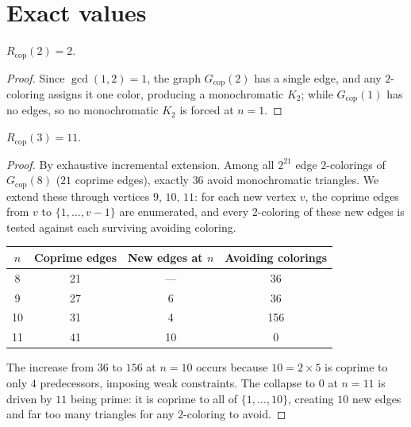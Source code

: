 \documentclass[12pt]{article}
\newcommand{\Rcop}{R_{\mathrm{cop}}}
\newcommand{\Gcop}{G_{\mathrm{cop}}}
\begin{document}
\section{Exact values}\label{sec:exact}

\begin{theorem}\label{thm:rcop2}
$\Rcop(2)=2$.
\end{theorem}

\begin{proof}
Since $\gcd(1,2)=1$, the graph $\Gcop(2)$ has a single edge, and any
$2$-coloring assigns it one color, producing a monochromatic $K_2$;
while $\Gcop(1)$ has no edges, so no monochromatic $K_2$ is forced at
$n=1$.
\end{proof}

\begin{theorem}\label{thm:rcop3}
$\Rcop(3)=11$.
\end{theorem}

\begin{proof}
By exhaustive incremental extension. Among all $2^{21}$ edge
$2$-colorings of $\Gcop(8)$ ($21$ coprime edges), exactly $36$ avoid
monochromatic triangles. We extend these through vertices $9$, $10$,
$11$: for each new vertex $v$, the coprime edges from $v$ to
$\{1,\ldots,v-1\}$ are enumerated, and every $2$-coloring of these new
edges is tested against each surviving avoiding coloring.

\begin{center}
\begin{tabular}{@{}cccc@{}}
\toprule
$n$ & Coprime edges & New edges at $n$ & Avoiding colorings \\
\midrule
8  & 21 & ---  & 36  \\
9  & 27 & 6  & 36  \\
10 & 31 & 4  & 156 \\
11 & 41 & 10 & 0   \\
\bottomrule
\end{tabular}
\end{center}

The increase from $36$ to $156$ at $n=10$ occurs because
$10=2\times 5$ is coprime to only $4$ predecessors, imposing weak
constraints. The collapse to $0$ at $n=11$ is driven by $11$ being
prime: it is coprime to all of $\{1,\ldots,10\}$, creating $10$ new
edges and far too many triangles for any $2$-coloring to avoid.
\end{proof}
\end{document}
